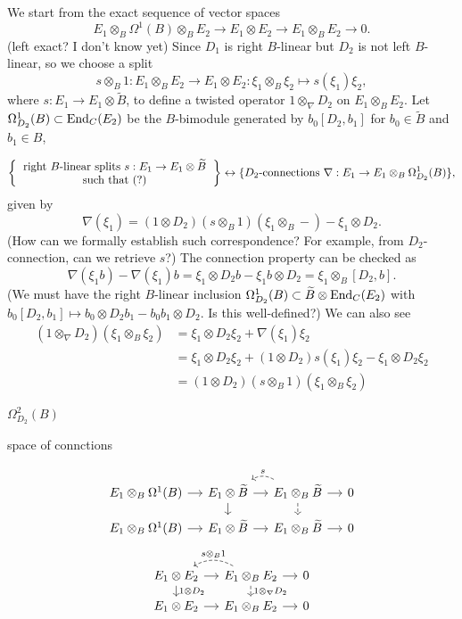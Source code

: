 \documentclass{../../large}
\begin{document}
\begin{prb}
We start from the exact sequence of vector spaces
\[E_1\otimes_B\Omega^1(B)\otimes_BE_2\to E_1\otimes E_2\to E_1\otimes_BE_2\to0.\]
(left exact? I don't know yet)
Since $D_1$ is right $B$-linear but $D_2$ is not left $B$-linear, so we choose a split
\[s\otimes_B1:E_1\otimes_BE_2\to E_1\otimes E_2:\xi_1\otimes_B\xi_2\mapsto s(\xi_1)\xi_2,\]
where $s:E_1\to E_1\otimes\tilde B$, to define a twisted operator $1\otimes_\nabla D_2$ on $E_1\otimes_BE_2$.
Let $\Omega^1_{D_2}(B)\subset\operatorname{End}_C(E_2)$ be the $B$-bimodule generated by $b_0[D_2,b_1]$ for $b_0\in\tilde B$ and $b_1\in B$,


\[\left\{\begin{tabular}{c}
right $B$-linear splits $s:E_1\to E_1\otimes\tilde B$\\such that (?)
\end{tabular}\right\}\leftrightarrow
\{\text{$D_2$-connections $\nabla:E_1\to E_1\otimes_B\Omega^1_{D_2}(B)$}\},\]
given by
\[\nabla(\xi_1)=(1\otimes D_2)(s\otimes_B1)(\xi_1\otimes_B-)-\xi_1\otimes D_2.\]
(How can we formally establish such correspondence? For example, from $D_2$-connection, can we retrieve $s$?)
The connection property can be checked as
\[\nabla(\xi_1b)-\nabla(\xi_1)b=\xi_1\otimes D_2b-\xi_1b\otimes D_2=\xi_1\otimes_B[D_2,b].\]
(We must have the right $B$-linear inclusion
$\Omega^1_{D_2}(B)\subset\widetilde B\otimes\operatorname{End}_C(E_2)$ with $b_0[D_2,b_1]\mapsto b_0\otimes D_2b_1-b_0b_1\otimes D_2$. Is this well-defined?)
We can also see
\begin{align*}
(1\otimes_\nabla D_2)(\xi_1\otimes_B\xi_2)
&=\xi_1\otimes D_2\xi_2+\nabla(\xi_1)\xi_2\\
&=\xi_1\otimes D_2\xi_2+(1\otimes D_2)s(\xi_1)\xi_2-\xi_1\otimes D_2\xi_2\\
&=(1\otimes D_2)(s\otimes_B1)(\xi_1\otimes_B\xi_2)
\end{align*}
\end{prb}

\begin{prb}

$\Omega^2_{D_2}(B)$

space of connctions
\end{prb}




\[\begin{tikzcd}[sep=small]
E_1\otimes_B\Omega^1(B)\rar&
E_1\otimes\tilde B \rar\dar&
E_1\otimes_B\tilde B\rar\dar[dashed]\lar[bend right,dashed,swap]{s}&0\\
E_1\otimes_B\Omega^1(B)\rar&
E_1\otimes\tilde B\rar&
E_1\otimes_B\tilde B\rar&0
\end{tikzcd}\]
\[\begin{tikzcd}[sep=small]
E_1\otimes E_2 \rar\dar{1\otimes D_2}&
E_1\otimes_BE_2\rar\dar[dashed]{1\otimes_\nabla D_2}\lar[bend right,dashed,swap]{s\otimes_B1}&0\\
E_1\otimes E_2\rar&
E_1\otimes_BE_2\rar&0
\end{tikzcd}\]
\end{document}
